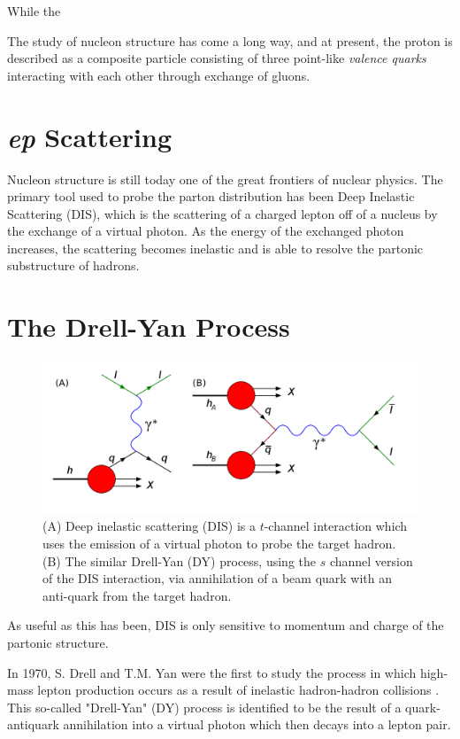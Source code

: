 While the 

The study of nucleon structure has come a long way, and at present, the proton 
is described as a composite particle consisting of three point-like \emph{valence quarks}
interacting with each other through exchange of gluons.






\section{\emph{ep} Scattering}

Nucleon structure is still today one of the great frontiers of nuclear physics.  The primary tool used to probe the parton distribution has been Deep Inelastic Scattering (DIS), which is the scattering of a charged lepton off of a nucleus by the exchange of a virtual photon.  As the energy of the exchanged photon increases, the scattering becomes inelastic and is able to resolve the partonic substructure of hadrons.

\section{The Drell-Yan Process}

\begin{figure}[h]
	\centering
	\includegraphics[width=4.50in]{figures/DIS-DY}
	\caption{(A) Deep inelastic scattering (DIS) is a $t$-channel interaction which uses the emission of a virtual photon to probe the target hadron. (B) The similar Drell-Yan (DY) process, using the $s$ channel version of the DIS interaction, via annihilation of a beam quark with an anti-quark from the target hadron.}
	\label{fig:dis-dy}
\end{figure}

As useful as this has been, DIS is only sensitive to momentum and charge of the partonic structure.

In 1970, S. Drell and T.M. Yan were the first to study the process in which high-mass lepton production occurs as a result of inelastic hadron-hadron collisions \cite{Drell:1970wh}.  This so-called "Drell-Yan" (DY) process is identified to be the result of a quark-antiquark annihilation into a virtual photon which then decays into a lepton pair. 

